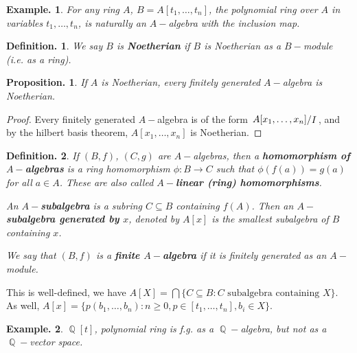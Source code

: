 \documentclass[11pt, a4paper]{memoir}
\DeclareMathOperator{\Q}{{\mathbb{Q}}}
\newcommand{\mbf}[1]{{\boldmath\bfseries #1}}
\theoremstyle{change}
\newtheorem{proposition}[theorem]{Proposition.}
\theoremstyle{plain}
\theoremstyle{nonumberplain}
\newtheorem{definition}{Definition.}
\newtheorem{example}{Example.}
\newtheorem{proof}{Proof}
\newcommand{\quot}[2]{\mathchoice{\left.\raisebox{0.10em}{$#1$}\middle/\raisebox{-0.10em}{$#2$}\right.}
                                 {\left.\raisebox{0.04em}{$#1$}\middle/\raisebox{-0.04em}{$#2$}\right.}
                                 {\left.\raisebox{0.01em}{$#1$}\middle/\raisebox{-0.01em}{$#2$}\right.}
                                 {\left.\raisebox{0em}{$#1$}\middle/\raisebox{0em}{$#2$}\right.}}
\numberwithin{equation}{section}
\begin{document}
\begin{example}
    For any ring $A$, $B=A[t_1,\ldots,t_n]$, the polynomial ring over $A$ in variables $t_1,\ldots,t_n$, is naturally an $A-$algebra with the inclusion map.
\end{example}
\begin{definition}
    We say $B$ is \textbf{Noetherian} if $B$ is Noetherian as a $B-$module (i.e. as a ring).
\end{definition}
\begin{proposition}
    If $A$ is Noetherian, every finitely generated $A-$algebra is Noetherian.
\end{proposition}
\begin{proof}
    Every finitely generated $A-$algebra is of the form $\quot{A[x_1,\ldots,x_n]}{I}$, and by the hilbert basis theorem, $A[x_1,\ldots,x_n]$ is Noetherian.
\end{proof}
\begin{definition}
    If $(B,f)$, $(C,g)$ are $A-$algebras, then a \mbf{homomorphism of $A-$algebras} is a ring homomorphism $\phi:B\to C$ such that $\phi(f(a))=g(a)$ for all $a\in A$.
    These are also called \mbf{$A-$linear (ring) homomorphisms}.

    An \mbf{$A-$subalgebra} is a subring $C\subseteq B$ containing $f(A)$.
    Then an \mbf{$A-$subalgebra generated by $x$}, denoted by $A[x]$ is the smallest subalgebra of $B$ containing $x$.

    We say that $(B,f)$ is a \mbf{finite $A-$algebra} if it is finitely generated as an $A-$module.
\end{definition}
This is well-defined, we have $A[X]=\bigcap\{C\subseteq B:C\text{ subalgebra containing $X$}\}$.
As well, $A[x]=\{p(b_1,\ldots,b_n):n\geq 0,p\in[t_1,\ldots,t_n],b_i\in X\}$.

\begin{example}
    $\Q[t]$, polynomial ring is f.g. as a $\Q-$algebra, but not as a $\Q-$vector space.
\end{example}
\end{document}
